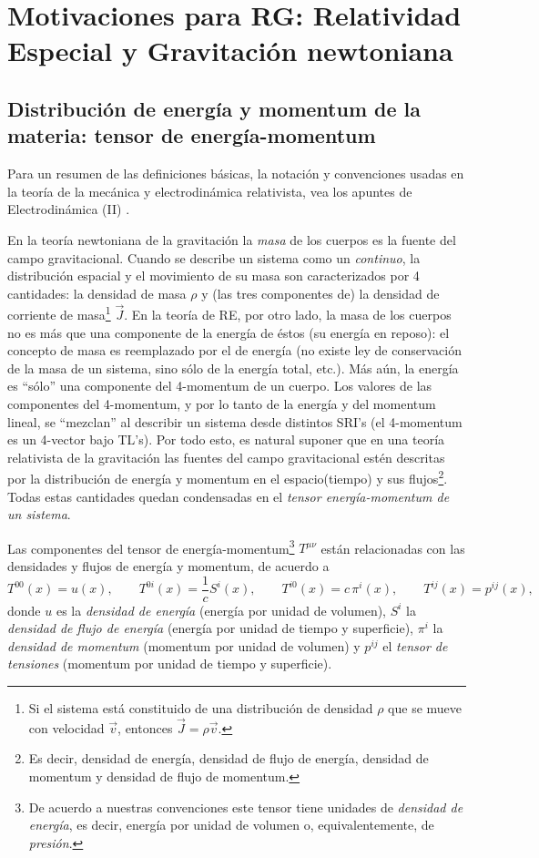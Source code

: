 \chapter{Motivaciones para RG: Relatividad Especial y Gravitación newtoniana}
\section{Distribución de energía y momentum de la materia: tensor de energía-momentum}

Para un resumen de las definiciones básicas, la notación y convenciones usadas en la teoría de la mecánica y electrodinámica relativista, vea los apuntes de Electrodinámica (II) \cite{7}.

En la teoría newtoniana de la gravitación la \textit{masa} de los cuerpos es la fuente del campo gravitacional. Cuando se describe un sistema como un \textit{continuo}, la distribución espacial y el movimiento de su masa son caracterizados por 4 cantidades: la densidad de masa $\rho$ y (las tres componentes de) la densidad de corriente de masa\footnote{Si el sistema está constituido de una distribución de densidad $\rho$ que se mueve con velocidad $\vec{v}$, entonces $\vec{J}=\rho\vec{v}$.} $\vec{J}$. En la teoría de RE, por otro lado, la masa de los cuerpos no es más que una componente de la energía de éstos (su energía en reposo): el concepto de masa es reemplazado por el de energía (no existe ley de conservación de la masa de un sistema, sino sólo de la energía total, etc.). Más aún, la energía es ``sólo'' una componente del 4-momentum de un cuerpo. Los valores de las componentes del 4-momentum, y por lo tanto de la energía y del momentum lineal, se ``mezclan'' al describir un sistema desde distintos SRI's (el 4-momentum es un 4-vector bajo TL's). Por todo esto, es natural suponer que en una teoría relativista de la gravitación las fuentes del campo gravitacional estén descritas por la distribución de energía y momentum en el espacio(tiempo) y sus flujos\footnote{Es decir, densidad de energía, densidad de flujo de energía, densidad de momentum y densidad de flujo de momentum.}. Todas estas cantidades quedan condensadas en el \textit{tensor energía-momentum de un sistema}.

Las componentes del tensor de energía-momentum\footnote{De acuerdo a nuestras convenciones este tensor tiene unidades de \textit{densidad de energía}, es decir, energía por unidad de volumen o, equivalentemente, de \textit{presión}.} $T^{\mu\nu}$ están relacionadas con las densidades y flujos de energía y momentum, de acuerdo a
\begin{equation}
 T^{00}(x)=u(x), \qquad T^{0i}(x)=\frac{1}{c}S^i(x), \qquad T^{i0}(x)=c\,\pi^i(x), \qquad T^{ij}(x)=p^{ij}(x),
\end{equation}
donde $u$ es la \textit{densidad de energía} (energía por unidad de volumen), $S^i$ la \textit{densidad de flujo de energía} (energía por unidad de tiempo y superficie), $\pi^i$ la \textit{densidad de momentum} (momentum por unidad de volumen) y $p^{ij}$ el \textit{tensor de tensiones} (momentum por unidad de tiempo y superficie).

